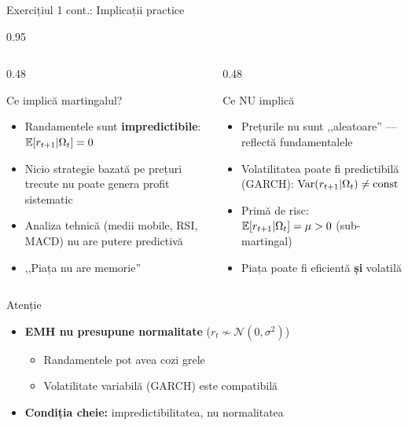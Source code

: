 \documentclass[9pt, aspectratio=169, t]{beamer}
\begin{document}
\begin{frame}[shrink=15]{Exercițiul 1 cont.: Implicații practice}
\begin{cminipage}{0.95\textwidth}
\begin{columns}[T]
\begin{column}{0.48\textwidth}
\begin{block}{Ce implică martingalul?}
\begin{itemize}\setlength{\itemsep}{0pt}
    \item Randamentele sunt \textbf{impredictibile}: $\mathbb{E}[r_{t+1} | \Omega_t] = 0$
    \item Nicio strategie bazată pe prețuri trecute nu poate genera profit sistematic
    \item Analiza tehnică (medii mobile, RSI, MACD) nu are putere predictivă
    \item ,,Piața nu are memorie''
\end{itemize}
\end{block}
\end{column}
\begin{column}{0.48\textwidth}
\begin{block}{Ce NU implică}
\begin{itemize}\setlength{\itemsep}{0pt}
    \item Prețurile nu sunt ,,aleatoare'' --- reflectă fundamentalele
    \item Volatilitatea poate fi predictibilă (GARCH): $\text{Var}(r_{t+1}|\Omega_t) \neq \text{const}$
    \item Primă de risc: $\mathbb{E}[r_{t+1}|\Omega_t] = \mu > 0$ (sub-martingal)
    \item Piața poate fi eficientă \textbf{și} volatilă
\end{itemize}
\end{block}
\end{column}
\end{columns}

\vspace{0.2cm}
\begin{alertblock}{Atenție}
\begin{itemize}\setlength{\itemsep}{0pt}
    \item \textbf{EMH nu presupune normalitate} ($r_t \not\sim \mathcal{N}(0, \sigma^2)$)
    \begin{itemize}\setlength{\itemsep}{0pt}
        \item Randamentele pot avea cozi grele
        \item Volatilitate variabilă (GARCH) este compatibilă
    \end{itemize}
    \item \textbf{Condiția cheie:} impredictibilitatea, nu normalitatea
\end{itemize}
\end{alertblock}
\end{cminipage}
\end{frame}
\end{document}

